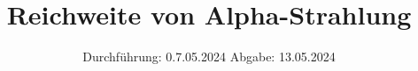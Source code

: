 

\subject{V701}
\title{Reichweite von Alpha-Strahlung}
\date{%
  Durchführung: 0.7.05.2024
  \hspace{3em}
  Abgabe: 13.05.2024
}



\maketitle
\thispagestyle{empty}
\tableofcontents
\newpage






\printbibliography{}


